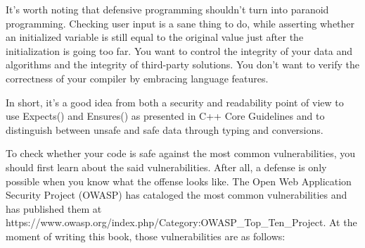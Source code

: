 It's worth noting that defensive programming shouldn't turn into paranoid programming. Checking user input is a sane thing to do, while asserting whether an initialized variable is still equal to the original value just after the initialization is going too far. You want to control the integrity of your data and algorithms and the integrity of third-party solutions. You don't want to verify the correctness of your compiler by embracing language features.

In short, it's a good idea from both a security and readability point of view to use Expects() and Ensures() as presented in C++ Core Guidelines and to distinguish between unsafe and safe data through typing and conversions.


To check whether your code is safe against the most common vulnerabilities, you should first learn about the said vulnerabilities. After all, a defense is only possible when you know what the offense looks like. The Open Web Application Security Project (OWASP) has cataloged the most common vulnerabilities and has published them at https://www.owasp.org/index.php/Category:OWASP\_Top\_Ten\_Project. At the moment of writing this book, those vulnerabilities are as follows:

